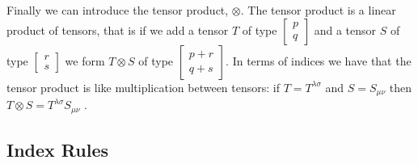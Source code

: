 Finally we can introduce the tensor product, \(\otimes\). 
The tensor product is a linear product of tensors, that is if we add a tensor \(T\) of type \( \left[ \begin{smallmatrix} p \\ q \end{smallmatrix} \right] \) and a tensor \(S\) of type \( \left[ \begin{smallmatrix} r \\ s \end{smallmatrix} \right] \) we form \(T \otimes S\) of type \( \left[ \begin{smallmatrix} p+r \\ q+s \end{smallmatrix} \right] \). In terms of indices we have that the tensor product is like multiplication between tensors: if \(T = T^{\lambda \sigma}\) and \(S = S_{\mu \nu}\) then \(T \otimes S = T^{\lambda \sigma} S_{\mu \nu}\) \cite{carroll, szekeres}.

\subsection{Index Rules}

